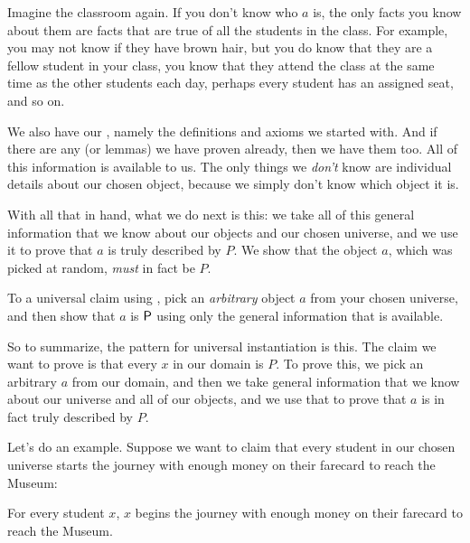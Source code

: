 \documentclass[../../../main.tex]{subfiles}
\begin{document}
Imagine the classroom again. If you don't know who $a$ is, the only facts you know about them are facts that are true of all the students in the class. For example, you may not know if they have brown hair, but you do know that they are a fellow student in your class, you know that they attend the class at the same time as the other students each day, perhaps every student has an assigned seat, and so on.

We also have our , namely the definitions and axioms we started with. And if there are any  (or lemmas) we have proven already, then we have them too. All of this information is available to us. The only things we \emph{don't} know are individual details about our chosen object, because we simply don't know which object it is.

With all that in hand, what we do next is this: we take all of this general information that we know about our objects and our chosen universe, and we use it to prove that $a$ is truly described by $P$. We show that the object $a$, which was picked at random, \emph{must} in fact be $P$.

\begin{aside}
  \begin{remark}
    To  a universal claim using , pick an \emph{arbitrary} object $a$ from your chosen universe, and then show that $a$ is $\P/$ using only the general information that is available.
  \end{remark}
\end{aside}

So to summarize, the pattern for universal instantiation is this. The claim we want to prove is that every $x$ in our domain is $P$. To prove this, we pick an arbitrary $a$ from our domain, and then we take general information that we know about our universe and all of our objects, and we use that to prove that $a$ is in fact truly described by $P$.

Let's do an example. Suppose we want to claim that every student in our chosen universe starts the journey with enough money on their farecard to reach the Museum:

\begin{framed}
  \begin{theorem}
    For every student $x$, $x$ begins the journey with enough money on their farecard to reach the Museum.
  \end{theorem}
\end{framed}
\end{document}
